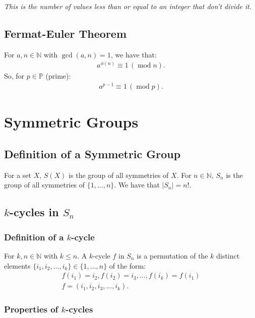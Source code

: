 \documentclass[a4paper, 12pt, twoside]{article}
\DeclareMathOperator{\Mod}{mod}
\DeclareMathOperator{\Gcd}{gcd}
\begin{document}
\vspace{\baselineskip}

\textit{This is the number of values less than or equal to an integer
that don't divide it.}

\subsection{Fermat-Euler Theorem}

For $a, n \in \mathbb{N}$ with $\Gcd(a, n) = 1$, we have that:
\begin{align*}
      a^{\phi(n)} \equiv 1 \, (\Mod n).
\end{align*}
So, for $p \in \mathbb{P}$ (prime):
\begin{align*}
      a^{p - 1} \equiv 1 \, (\Mod p).
\end{align*}

\section{Symmetric Groups}

\subsection{Definition of a Symmetric Group}

For a set $X$, $S(X)$ is the group of all symmetries of $X$.
For $n \in \mathbb{N}$, $S_n$ is the group of all symmetries of
$\{1, \ldots, n\}$. We have that $|S_n| = n!$.

\subsection{$k$-cycles in $S_n$}

\subsubsection{Definition of a $k$-cycle}

For $k, n \in \mathbb{N}$ with $k \leq n$. A $k$-cycle $f$ in $S_n$
is a permutation of the $k$ distinct elements $\{i_1, i_2, \ldots,
i_k\} \in \{1, \ldots, n\}$ of the form:
\begin{gather*}
      f(i_1) = i_2, f(i_2) = i_3, \ldots, f(i_k) = f(i_1) \\
      f = (i_1, i_2, i_3, \ldots, i_k).
\end{gather*}

\subsubsection{Properties of $k$-cycles}
\end{document}
